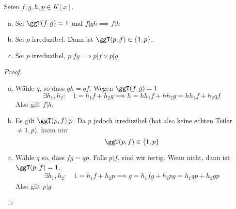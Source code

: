 \documentclass[a4paper, 10pt]{scrbook}
\begin{document}
\begin{lem}
\label{lem:12.4}
Seien $f,g,h,p\in K[x]$.
\begin{enumerate}[(a)]
\item Sei $\ggT(f,g)=1$ und $f|gh \implies f|h$
\item Sei $p$ irreduzibel.
Dann ist $\ggT(p,f)\in \{1,p\}$.
\item Sei $p$ irreduzibel, $p|fg \implies p|f \lor p|g$.
\end{enumerate}

\begin{proof}
\begin{enumerate}[(a)]
\item Wähle $q$, so dass $gh = qf$.
	Wegen $\ggT(f,g)=1$
\[
\exists h_1,h_2 :\quad 1 = h_1f + h_2g \implies h=hh_1f +hh_2g = hh_1f + h_2qf
\]
Also gilt $f|h$.
\item 
	Es gilt $\ggT(p,f)|p$.
	Da $p$ jedoch irreduzibel (hat also keine echten Teiler $\neq 1, p$), kann nur
	\[
		\ggT(p,f)\in \{1,p\}
	\]
\item 
	Wähle $q$ so, dass $fg=qp$.
	Falls $p|f$, sind wir fertig.
Wenn nicht, dann ist $\ggT(p,f)=1$.
\begin{align*}
	\exists h_1,h_2:\quad 1 =h_1f+h_2p \implies g =h_1fg+h_2pg =h_1qp + h_2g p
\end{align*}
Also gilt $p|g$
\end{enumerate}
\end{proof}
\end{lem}
\end{document}
